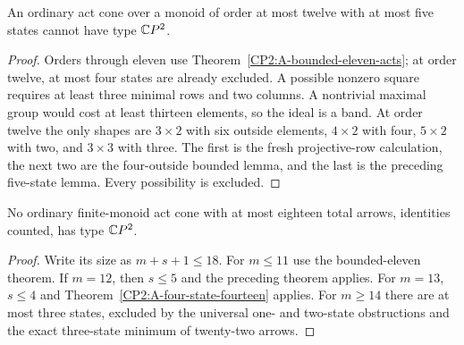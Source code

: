 \begin{theorem}
\label{CP2:A-twelve-five-state}
An ordinary act cone over a monoid of order at most
twelve with at most five states cannot have type
$\mathbb{C}P^2$.
\end{theorem}
\begin{proof}
Orders through eleven use
Theorem~\ref{CP2:A-bounded-eleven-acts}; at order twelve,
at most four states are already excluded. A possible
nonzero square requires at least three minimal rows
and two columns. A nontrivial maximal group would
cost at least thirteen elements, so the ideal is a band.
At order twelve the only shapes are $3\times2$ with
six outside elements, $4\times2$ with four,
$5\times2$ with two, and $3\times3$ with three.
The first is the fresh projective-row calculation,
the next two are the four-outside bounded lemma,
and the last is the preceding five-state lemma.
Every possibility is excluded.
\end{proof}

\begin{corollary}
\label{CP2:A-ordinary-act-eighteen}
No ordinary finite-monoid act cone with at most eighteen
total arrows, identities counted, has type $\mathbb{C}P^2$.
\end{corollary}
\begin{proof}
Write its size as $m+s+1\leq18$. For $m\leq11$
use the bounded-eleven theorem. If $m=12$, then
$s\leq5$ and the preceding theorem applies. For
$m=13$, $s\leq4$ and
Theorem~\ref{CP2:A-four-state-fourteen} applies.
For $m\geq14$ there are at most three states, excluded
by the universal one- and two-state obstructions and
the exact three-state minimum of twenty-two arrows.
\end{proof}

